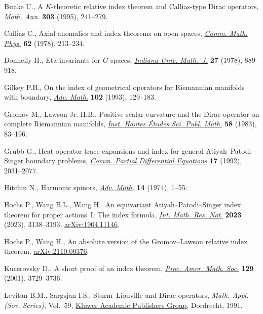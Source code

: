 \documentclass[pdftex]{sigma}%
\numberwithin{equation}{section}
\begin{document}
\begin{thebibliography}{99}
Bunke U., A {$K$}-theoretic relative index theorem and {C}allias-type {D}irac
 operators, \href{https://doi.org/10.1007/BF01460989}{\textit{Math. Ann.}} \textbf{303} (1995), 241--279.

Callias C., Axial anomalies and index theorems on open spaces, \href{https://doi.org/10.1007/BF01202525}{\textit{Comm.
 Math. Phys.}} \textbf{62} (1978), 213--234.

Donnelly H., Eta invariants for {$G$}-spaces, \href{https://doi.org/10.1512/iumj.1978.27.27060}{\textit{Indiana Univ. Math.~J.}}
 \textbf{27} (1978), 889--918.

Gilkey P.B., On the index of geometrical operators for {R}iemannian manifolds
 with boundary, \href{https://doi.org/10.1006/aima.1993.1063}{\textit{Adv. Math.}} \textbf{102} (1993), 129--183.

Gromov M., Lawson Jr. H.B., Positive scalar curvature and the {D}irac operator
 on complete {R}iemannian manifolds, \href{https://doi.org/10.1007/BF02953774}{\textit{Inst. Hautes \'Etudes Sci. Publ.
 Math.}} \textbf{58} (1983), 83--196.

Grubb G., Heat operator trace expansions and index for general
 {A}tiyah--{P}atodi--{S}inger boundary problems, \href{https://doi.org/10.1080/03605309208820913}{\textit{Comm. Partial
 Differential Equations}} \textbf{17} (1992), 2031--2077.

Hitchin N., Harmonic spinors, \href{https://doi.org/10.1016/0001-8708(74)90021-8}{\textit{Adv. Math.}} \textbf{14} (1974), 1--55.

Hochs P., Wang B.L., Wang H., An equivariant {A}tiyah--{P}atodi--{S}inger index
 theorem for proper actions~{I}: {T}he index formula, \href{https://doi.org/10.1093/imrn/rnab324}{\textit{Int. Math. Res.
 Not.}} \textbf{2023} (2023), 3138--3193, \href{https://arxiv.org/abs/1904.11146}{arXiv:1904.11146}.

Hochs P., Wang H., An absolute version of the {G}romov--{L}awson relative index
 theorem, \href{https://arxiv.org/abs/2110.00376}{arXiv:2110.00376}.

Kucerovsky D., A short proof of an index theorem, \href{https://doi.org/10.1090/S0002-9939-01-06164-0}{\textit{Proc. Amer. Math.
 Soc.}} \textbf{129} (2001), 3729--3736.

Levitan B.M., Sargsjan I.S., Sturm--{L}iouville and {D}irac operators,
 \textit{Math. Appl. (Sov. Series)}, Vol.~59, \href{https://doi.org/10.1007/978-94-011-3748-5}{Kluwer Academic Publishers
 Group}, Dordrecht, 1991.


\end{thebibliography}
\end{document}
